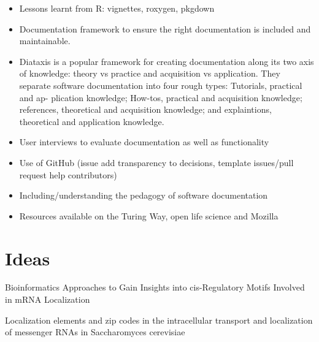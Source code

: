 \documentclass{SBCbookchapter}
\begin{document}
\begin{itemize}
    \item Lessons learnt from R: vignettes, roxygen, pkgdown
    \item Documentation framework to ensure the right documentation is included and maintainable.
    \item Diataxis is a popular framework for creating documentation along its two axis of knowledge: theory vs practice and acquisition vs application. They separate software documentation into four rough types: Tutorials, practical and ap- plication knowledge; How-tos, practical and acquisition knowledge; references, theoretical and acquisition knowledge; and explaintions, theoretical and application knowledge. %
    \item User interviews to evaluate documentation as well as functionality
    \item Use of GitHub (issue add transparency to decisions, template issues/pull request help contributors)
    \item Including/understanding the pedagogy of software documentation
    \item Resources available on the Turing Way, open life science and Mozilla
\end{itemize}

\section{Ideas}

Bioinformatics Approaches to Gain Insights into cis-Regulatory Motifs Involved in mRNA Localization %

Localization elements and zip codes in the intracellular transport and localization of messenger RNAs in Saccharomyces cerevisiae




\end{document}
